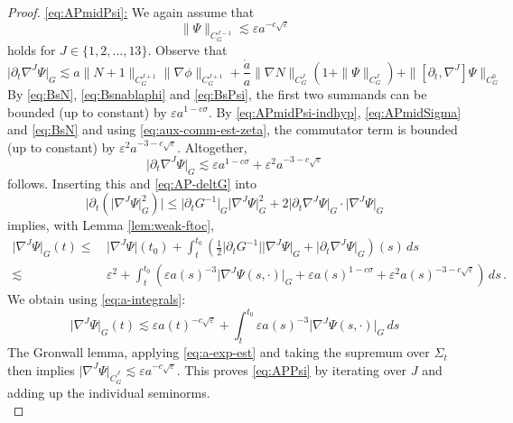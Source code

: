 \documentclass[11pt,leqno,textwidth=10cm]{amsart}
\numberwithin{equation}{section}
\theoremstyle{definition}
\theoremstyle{plain}
\newcommand{\1}{\mathbbm{1}}
\renewcommand{\epsilon}{\varepsilon}
\newcommand{\del}{\partial}
\begin{document}
\begin{proof}
\underline{\eqref{eq:APmidPsi}:} We again assume that
\begin{equation}\label{eq:APmidPsi-indhyp}
\|\Psi\|_{C^{J-1}_G}\lesssim \epsilon a^{-c\sqrt{\epsilon}}
\end{equation}
holds for $J\in\{1,2,\dots,13\}$. Observe that
\[\lvert\del_t\nabla^J\Psi\rvert_G\lesssim a\|N+1\|_{C^{J+1}_G}\|\nabla\phi\|_{C^{J+1}_G}+\frac{\dot{a}}a\|\nabla N\|_{C^{J}_G}(1+\|\Psi\|_{C^J_G})+\|[\del_t,\nabla^J]\Psi\|_{C^0_G}\]
By \eqref{eq:BsN}, \eqref{eq:Bsnablaphi} and \eqref{eq:BsPsi}, the first two summands can be bounded (up to constant) by $\epsilon a^{1-c\sigma}$. By \eqref{eq:APmidPsi-indhyp}, \eqref{eq:APmidSigma} and \eqref{eq:BsN} and using \eqref{eq:aux-comm-est-zeta}, the commutator term is bounded (up to constant) by $\epsilon^2a^{-3-c\sqrt{\epsilon}}$. Altogether, 
\[\lvert\del_t\nabla^J\Psi\rvert_G\lesssim \epsilon a^{1-c\sigma}+\epsilon^2a^{-3-c\sqrt{\epsilon}}\]
follows. Inserting this and \eqref{eq:AP-deltG} into
\begin{equation*}
\lvert\del_t\left(\lvert\nabla^J\Psi\rvert_G^2\right)\rvert\leq\lvert\del_tG^{-1}\rvert_G\lvert\nabla^J\Psi\rvert_G^2+2\lvert\del_t\nabla^J\Psi\rvert_G\cdot\lvert\nabla^J\Psi\rvert_G
\end{equation*}
implies, with Lemma \ref{lem:weak-ftoc},
\begin{align*}
\lvert\nabla^J\Psi\rvert_G(t)\leq&\,\lvert\nabla^J\Psi\rvert(t_0)+\int_t^{t_0}\left(\frac12\lvert\del_t G^{-1}\rvert\lvert\nabla^J\Psi\rvert_G+\lvert\del_t\nabla^J\Psi\rvert_G\right)(s)\,ds\\
\lesssim&\,\epsilon^2+\int_t^{t_0}\left(\epsilon a(s)^{-3}\lvert\nabla^J\Psi(s,\cdot)\rvert_G+\epsilon a(s)^{1-c\sigma}+\epsilon^2a(s)^{-3-c\sqrt{\epsilon}}\right)\,ds\,.
\end{align*}
We obtain using \eqref{eq:a-integrals}:
\begin{equation*}
\lvert\nabla^J\Psi\rvert_G(t)\lesssim \epsilon a(t)^{-c\sqrt{\epsilon}}+\int_t^{t_0}\epsilon a(s)^{-3}\lvert\nabla^J\Psi(s,\cdot)\rvert_G\,ds
\end{equation*}
The Gronwall lemma, applying \eqref{eq:a-exp-est} and taking the supremum over $\Sigma_t$ then implies $\lvert\nabla^J\Psi\rvert_{\dot{C}^J_G}\lesssim \epsilon a^{-c\sqrt{\epsilon}}$. This proves \eqref{eq:APPsi} by iterating over $J$ and adding up the individual seminorms.\\


\end{proof}
\end{document}

